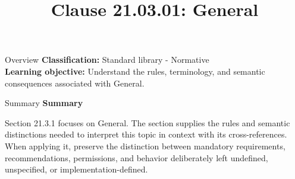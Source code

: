 \documentclass[10pt,letterpaper]{article}
\title{Clause 21.03.01: General}
\author{}
\date{}
\begin{document}
\maketitle
\begin{CornellOverviewBox}{Overview}
\textbf{Classification:} Standard library - Normative\\[2pt]
\textbf{Learning objective:} Understand the rules, terminology, and semantic consequences associated with General.
\end{CornellOverviewBox}\begin{CornellSummaryBox}{Summary}
{\sffamily\bfseries\color{Accent} Summary}\par\vspace{3pt}Section 21.3.1 focuses on General. The section supplies the rules and semantic distinctions needed to interpret this topic in context with its cross-references. When applying it, preserve the distinction between mandatory requirements, recommendations, permissions, and behavior deliberately left undefined, unspecified, or implementation-defined.
\end{CornellSummaryBox}
\end{document}
